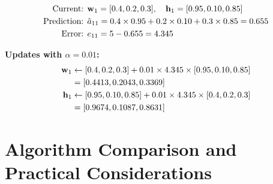 \documentclass{beamer}
\begin{document}
\begin{frame}\begin{align}
\text{Current: } &\mathbf{w}_1 = [0.4, 0.2, 0.3], \quad \mathbf{h}_1 = [0.95, 0.10, 0.85] \\
\text{Prediction: } &\hat{a}_{11} = 0.4 \times 0.95 + 0.2 \times 0.10 + 0.3 \times 0.85 = 0.655 \\
\text{Error: } &e_{11} = 5 - 0.655 = 4.345
\end{align}

\pause
\textbf{Updates with $\alpha = 0.01$:}
\begin{align}
\mathbf{w}_1 &\leftarrow [0.4, 0.2, 0.3] + 0.01 \times 4.345 \times [0.95, 0.10, 0.85] \\
&= [0.4413, 0.2043, 0.3369] \\
\mathbf{h}_1 &\leftarrow [0.95, 0.10, 0.85] + 0.01 \times 4.345 \times [0.4, 0.2, 0.3] \\
&= [0.9674, 0.1087, 0.8631]
\end{align}
\end{frame}


\section{Algorithm Comparison and Practical Considerations}
\end{document}

